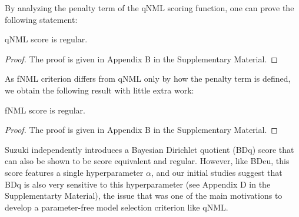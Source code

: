 By analyzing the penalty term of the qNML scoring function, one can prove the following statement:
\begin{theorem}
qNML score is regular.
\end{theorem}
\begin{proof}
The proof is given in Appendix B in the Supplementary Material.
\end{proof}
As fNML criterion differs from qNML only by how the penalty term is defined, we obtain the following result with little extra work:
\begin{theorem}
fNML score is regular.
\end{theorem}
\begin{proof}
The proof is given in Appendix B in the Supplementary Material.
\end{proof}

Suzuki \cite{Suzuki2017} independently introduces a Bayesian Dirichlet
quotient (BDq) score that can also be shown to be score equivalent
and regular.  However, like BDeu, this score features a single
hyperparameter $\alpha$, and our initial studies suggest that BDq is
also very sensitive to this hyperparameter (see Appendix D in the
Supplementarty Material), the issue that was one of the main
motivations to develop a parameter-free model selection criterion like
qNML.
